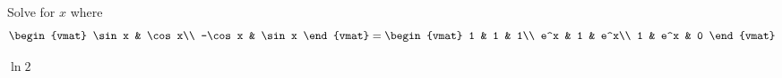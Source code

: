 
\begin{Exercise}[
name={},
title={}, 
difficulty=0,
origin={\cite{BS}}]
Solve for $x$ where
\[
\begin{vmat}
\sin x & \cos x\\
-\cos x & \sin x
\end{vmat}
=
\begin{vmat}
1 & 1 & 1\\
e^x & 1 & e^x\\
1 & e^x & 0
\end{vmat}
\]
\end{Exercise}
\begin{Answer}
$\ln 2$
\end{Answer}
